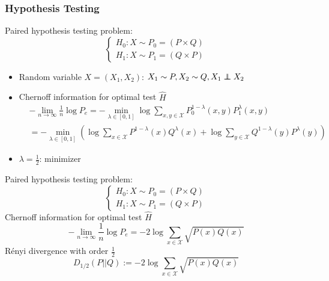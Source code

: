 \documentclass{beamer}
\newcommand\independent{\protect\mathpalette{\protect\independenT}{\perp}}
\def\independenT#1#2{\mathrel{\rlap{$#1#2$}\mkern2mu{#1#2}}}
\begin{document}
\begin{frame}\frametitle{Hypothesis Testing}
Paired hypothesis testing problem:
\begin{equation*}
\begin{cases}
H_0: X \sim P_0=(P \times Q)\\
H_1: X \sim P_1=(Q \times P)
\end{cases}
\end{equation*}
\begin{itemize}
\item Random variable $X=(X_1, X_2)$: $X_1 \sim P, X_2 \sim Q, X_1 \independent X_2$
\item Chernoff information for optimal test $\widehat{H}$
\begin{align*}
&-\lim_{n\to\infty} \frac{1}{n}\log P_e = -\min_{\lambda \in [0,1]}
\log \sum_{x,y\in \mathcal{X}}
P^{1-\lambda}_0(x,y) P^{\lambda}_1(x,y)  \\
&= -\min_{\lambda \in [0,1]}
\left(\log \sum_{x\in \mathcal{X}}
P^{1-\lambda}(x) Q^{\lambda}(x) 
+\log \sum_{y\in \mathcal{X}}
Q^{1-\lambda}(y) P^{\lambda}(y) 
\right)
\end{align*}
\item $\lambda=\frac{1}{2}$: minimizer
\end{itemize}
\end{frame}
\begin{frame}
Paired hypothesis testing problem:
\begin{equation*}
\begin{cases}
H_0: X \sim P_0=(P \times Q)\\
H_1: X \sim P_1=(Q \times P)
\end{cases}
\end{equation*}
Chernoff information for optimal test $\widehat{H}$
\begin{equation*}
-\lim_{n\to \infty} \frac{1}{n}\log P_e = -2 \log \sum_{x\in \mathcal{X}} \sqrt{P(x)Q(x)}
\end{equation*}
Rényi divergence with order $\frac{1}{2}$
\begin{equation*}
D_{1/2}(P||Q) := -2 \log \sum_{x\in \mathcal{X}} \sqrt{P(x)Q(x)}
\end{equation*}
\end{frame}
\end{document}
